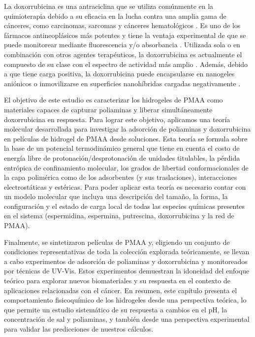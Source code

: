 La doxorrubicina es una antraciclina que se utiliza com\'unmente en la quimioterapia debido a su eficacia en la lucha contra una amplia gama de c\'anceres, como carcinomas, sarcomas y c\'anceres hematol\'ogicos \cite{Panis2012}.
Es uno de los f\'armacos antineopl\'asicos m\'as potentes y tiene la ventaja experimental de que se puede monitorear mediante fluorescencia y/o absorbancia  \cite{Serpe2005}.
Utilizada sola o en combinaci\'on con otros agentes terap\'euticos, la doxorrubicina es actualmente el compuesto de su clase con el espectro de actividad m\'as amplio  \cite{Carvalho2009}.
Adem\'as, debido a que tiene carga positiva, la doxorrubicina puede encapsularse en nanogeles ani\'onicos \cite{Li2019} o inmovilizarse en superficies nanoh\'ibridas cargadas negativamente \cite{kazempour2019}.

El objetivo de este estudio es caracterizar los hidrogeles de PMAA como materiales capaces de capturar poliaminas y liberar simult\'aneamente doxorrubicina en respuesta.
Para lograr este objetivo, aplicamos una teor\'ia molecular desarrollada para investigar la adsorci\'on de poliaminas y doxorrubicina en pel\'iculas de hidrogel de PMAA desde soluciones.
Esta teor\'ia se formula sobre la base de un potencial termodin\'amico general que tiene en cuenta el costo de energ\'ia libre de protonaci\'on/desprotonaci\'on de unidades titulables, la p\'erdida entr\'opica de confinamiento molecular, los grados de libertad conformacionales de la capa polim\'erica como de los adsorbentes (y sus traslaciones),  interacciones electrost\'aticas y est\'ericas.
Para poder aplicar esta teor\'ia es necesario contar con un modelo molecular que incluya una descripci\'on del tama\~no, la forma, la configuraci\'on y el estado de carga local de todas las especies qu\'imicas presentes en el sistema (espermidina, espermina, putrescina, doxorrubicina y la red de PMAA).

Finalmente, se sintetizaron pel\'iculas de PMAA y, eligiendo un conjunto de condiciones representativas de toda la colecci\'on explorada te\'oricamente, se llevan  a cabo experimentos de adsorci\'on de poliaminas y doxorrubicina y monitoreados por t\'ecnicas de UV-Vis.
Estos experimentos demuestran la idoneidad del enfoque te\'orico para explorar nuevos biomateriales y su respuesta en el contexto de aplicaciones relacionadas con el c\'ancer.
En resumen, este cap\'itulo presenta el comportamiento fisicoqu\'imico de los hidrogeles desde una perspectiva te\'orica, lo que permite un estudio sistem\'atico de su respuesta a cambios en el pH, la concentraci\'on de sal y poliaminas, y tambi\'en desde una perspectiva experimental para validar las predicciones de nuestros c\'alculos.


